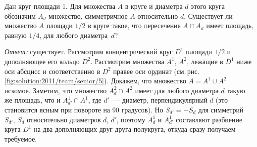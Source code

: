 \problem
{}
Дан круг площади 1.
Для множества $A$ в круге и диаметра $d$ этого круга обозначим $A_d$ множество,
симметричное $A$ относительно $d$.
Существует ли множество $A$ площади $1 / 2$ в круге такое, что пересечение
$A \cap A_d$ имеет площадь, равную $1/4$, для любого диаметра~$d$?

%
\label{solution:2011/team/senior/5}%
\emph{Ответ:} существует.
Рассмотрим концентрический круг $D^1$ площади $1 / 2$ и дополняющее его кольцо
$D^2$.
Рассмотрим множества $A^1$, $A^2$, лежащие в $D^1$ ниже оси абсцисс и
соответственно в $D^2$ правее оси ординат
(см.\,рис.\,\ref{fig:solution:2011/team/senior/5}).
Докажем, что множество $A = A^1 \cup A^2$ искомое.
Заметим, что множество $A^2_d \cap A^2$ имеет для любого диаметра $d$ такую же
площадь, что и $A^1_{d'} \cap A^1$, где $d'$~--- диаметр, перпендикулярный $d$
(это становится ясным при повороте на 90 градусов).
Но $S_{d'} = -S_d$ для симметрий $S_{d'}$, $S_d$ относительно диаметров $d$,
$d'$, поэтому $A^1_d$ и $A^1_{d'}$ составляют разбиение круга $D^1$ на два
дополняющих друг друга полукруга, откуда сразу получаем требуемое.

\endproblem
